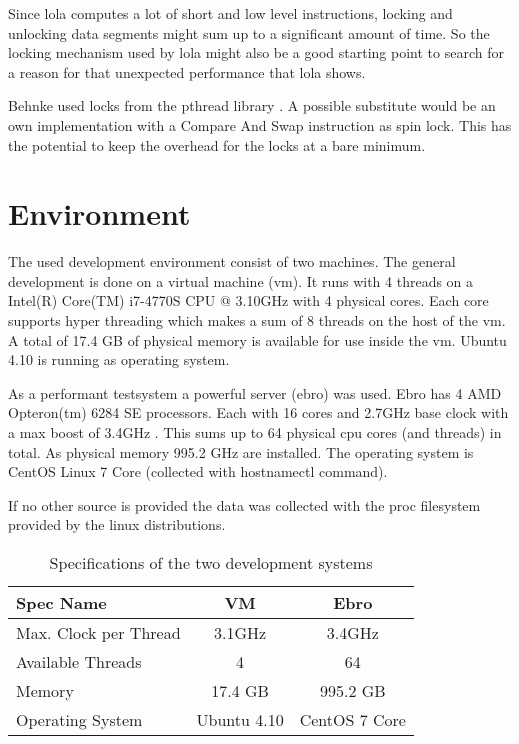Since lola computes a lot of short and low level instructions, locking and unlocking data segments might sum up to a significant amount of time. So the locking mechanism used by lola might also be a good starting point to search for a reason for that unexpected performance that lola shows.

Behnke used locks from the pthread library \cite{?}. A possible substitute would be an own implementation with a Compare And Swap instruction as spin lock. This has the potential to keep the overhead for the locks at a bare minimum.

\section{Environment}
\label{env}
The used development environment consist of two machines. The general development is done on a virtual machine (vm). It runs with 4 threads on a Intel(R) Core(TM) i7-4770S CPU @ 3.10GHz with 4 physical cores. Each core supports hyper threading which makes a sum of 8 threads on the host of the vm. A total of 17.4 GB of physical memory is available for use inside the vm. Ubuntu 4.10 is running as operating system.

As a performant testsystem a powerful server (ebro) was used. Ebro has 4 AMD Opteron(tm) 6284 SE processors. Each with 16 cores and 2.7GHz base clock with a max boost of 3.4GHz \cite{AMDSpecs}. This sums up to 64 physical cpu cores (and threads) in total. As physical memory 995.2 GHz are installed. The operating system is CentOS Linux 7 Core (collected with hostnamectl command).

If no other source is provided the data was collected with the proc filesystem provided by the linux distributions.
\begin{center}
    \begin{table}[H]
        \centering
        \begin{tabular}{ | l | c | c |}
            \hline
            \textbf{Spec Name} & \textbf{VM} & \textbf{Ebro} \\ \hline
            Max. Clock per Thread & 3.1GHz & 3.4GHz \\ 
            Available Threads & 4 & 64 \\ 
            Memory & 17.4 GB & 995.2 GB\\ 
            Operating System & Ubuntu 4.10 & CentOS 7 Core \\ \hline
        \end{tabular}
        \caption{Specifications of the two development systems}
    \end{table}
\end{center}

